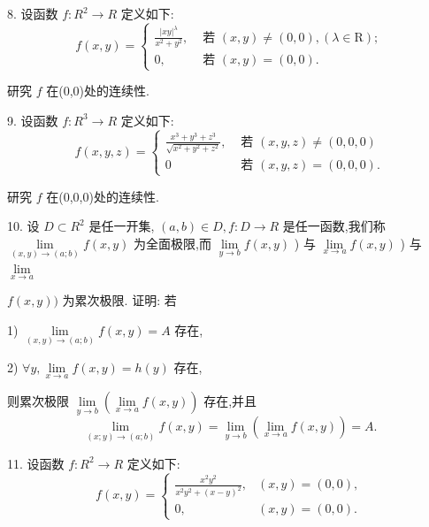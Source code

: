 8. 设函数 $f : {R}^{2} \rightarrow  R$ 定义如下:
$$f\left( {x,y}\right)  = \left\{  \begin{matrix} \frac{{\left| xy\right| }^{\lambda }}{{x}^{2} + {y}^{2}}, & \text{ 若 }\left( {x,y}\right)  \neq  \left( {0,0}\right) ,\left( {\lambda  \in  \mathrm{R}}\right) ; \\  0, & \text{ 若 }\left( {x,y}\right)  = \left( {0,0}\right) . \end{matrix}\right.$$

研究 $f$ 在(0,0)处的连续性.

9. 设函数 $f : {R}^{3} \rightarrow  R$ 定义如下:
$$f\left( {x,y,z}\right)  = \left\{  \begin{matrix} \frac{{x}^{3} + {y}^{3} + {z}^{3}}{\sqrt{{x}^{2} + {y}^{2} + {z}^{2}}}, & \text{ 若 }\left( {x,y,z}\right)  \neq  \left( {0,0,0}\right) \\  0 & \text{ 若 }\left( {x,y,z}\right)  = \left( {0,0,0}\right) . \end{matrix}\right.$$

研究 $f$ 在(0,0,0)处的连续性.

10. 设 $D \subset  {R}^{2}$ 是任一开集, $\left( {a,b}\right)  \in  D,f : D \rightarrow  R$ 是任一函数,我们称 $\mathop{\lim }\limits_{{\left( {x,y}\right)  \rightarrow  \left( {a;b}\right) }}f\left( {x,y}\right)$ 为全面极限,而 $\mathop{\lim }\limits_{{y \rightarrow  b}}f\left( {x,y}\right)$ ) 与 $\mathop{\lim }\limits_{{x \rightarrow  a}}f\left( {x,y}\right)$ ) 与 $\mathop{\lim }\limits_{{x \rightarrow  a}}$

$f\left( {x,y}\right) )$ 为累次极限. 证明: 若

1) $\mathop{\lim }\limits_{{\left( {x,y}\right)  \rightarrow  \left( {a;b}\right) }}f\left( {x,y}\right)  = A$ 存在,

2) $\forall y,\mathop{\lim }\limits_{{x \rightarrow  a}}f\left( {x,y}\right)  = h\left( y\right)$ 存在,

则累次极限 $\mathop{\lim }\limits_{{y \rightarrow  b}}\left( {\mathop{\lim }\limits_{{x \rightarrow  a}}f\left( {x,y}\right) }\right)$ 存在,并且
$$\mathop{\lim }\limits_{{\left( {x;y}\right)  \rightarrow  \left( {a;b}\right) }}f\left( {x,y}\right)  = \mathop{\lim }\limits_{{y \rightarrow  b}}\left( {\mathop{\lim }\limits_{{x \rightarrow  a}}f\left( {x,y}\right) }\right)  = A.$$

11. 设函数 $f : {R}^{2} \rightarrow  R$ 定义如下:
$$f\left( {x,y}\right)  = \left\{  \begin{matrix} \frac{{x}^{2}{y}^{2}}{{x}^{2}{y}^{2} + {\left( x - y\right) }^{2}}, & \left( {x,y}\right)  = \left( {0,0}\right) , \\  0, & \left( {x,y}\right)  = \left( {0,0}\right) . \end{matrix}\right.$$

